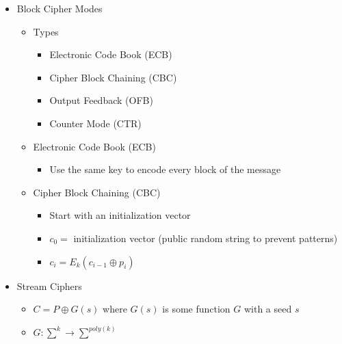 \begin{itemize}
\begin{itemize}
\begin{itemize}
        \end{itemize}
    \end{itemize}
\item Block Cipher Modes
    \begin{itemize}
    \item Types
        \begin{itemize}
        \item Electronic Code Book (ECB)
        \item Cipher Block Chaining (CBC)
        \item Output Feedback (OFB)
        \item Counter Mode (CTR)
        \end{itemize}
    \item Electronic Code Book (ECB)
        \begin{itemize}
        \item Use the same key to encode every block of the message
        \end{itemize}
    \item Cipher Block Chaining (CBC)
        \begin{itemize}
        \item Start with an initialization vector
        \item $c_0 =$ initialization vector (public random string to prevent patterns)
        \item $c_i = E_k(c_{i-1} \oplus p_i)$
        \end{itemize}
    \end{itemize}
\item Stream Ciphers
    \begin{itemize}
    \item $C = P \oplus G(s)$ where $G(s)$ is some function $G$ with a seed $s$
    \item $G: \sum^k\rightarrow \sum^{poly(k)}$
    \end{itemize}
\end{itemize}